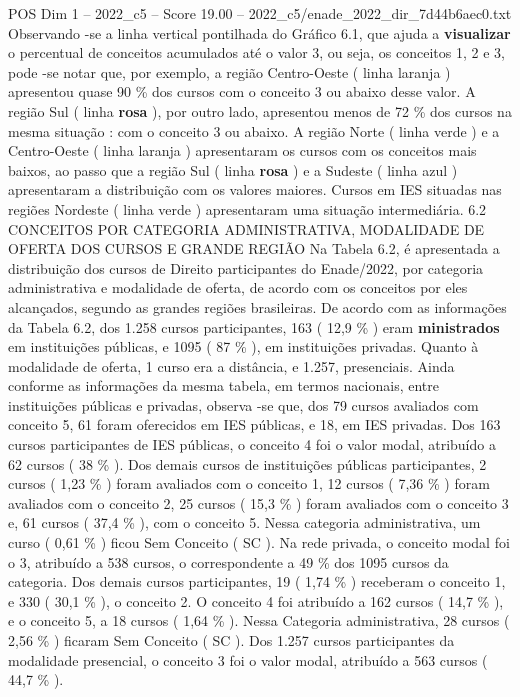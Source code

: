 \begin{textsample}{POS Dim 1 – 2022\_c5 – Score 19.00 – 2022\_c5/enade\_2022\_dir\_7d44b6aec0.txt}
Observando -se a linha vertical pontilhada do Gráfico 6.1, que ajuda a \textbf{visualizar} o percentual de conceitos acumulados até o valor 3, ou seja, os conceitos 1, 2 e 3, pode -se notar que, por exemplo, a região Centro-Oeste ( linha laranja ) apresentou quase 90 \% dos cursos com o conceito 3 ou abaixo desse valor.
A região Sul ( linha \textbf{rosa} ), por outro lado, apresentou menos de 72 \% dos cursos na mesma situação : com o conceito 3 ou abaixo.
A região Norte ( linha verde ) e a Centro-Oeste ( linha laranja ) apresentaram os cursos com os conceitos mais baixos, ao passo que a região Sul ( linha \textbf{rosa} ) e a Sudeste ( linha azul ) apresentaram a distribuição com os valores maiores.
Cursos em IES situadas nas regiões Nordeste ( linha verde ) apresentaram uma situação intermediária. 6.2 CONCEITOS POR CATEGORIA ADMINISTRATIVA, MODALIDADE DE OFERTA DOS CURSOS E GRANDE REGIÃO Na Tabela 6.2, é apresentada a distribuição dos cursos de Direito participantes do Enade/2022, por categoria administrativa e modalidade de oferta, de acordo com os conceitos por eles alcançados, segundo as grandes regiões brasileiras.
De acordo com as informações da Tabela 6.2, dos 1.258 cursos participantes, 163 ( 12,9 \% ) eram \textbf{ministrados} em instituições públicas, e 1095 ( 87 \% ), em instituições privadas.
Quanto à modalidade de oferta, 1 curso era a distância, e 1.257, presenciais.
Ainda conforme as informações da mesma tabela, em termos nacionais, entre instituições públicas e privadas, observa -se que, dos 79 cursos avaliados com conceito 5, 61 foram oferecidos em IES públicas, e 18, em IES privadas.
Dos 163 cursos participantes de IES públicas, o conceito 4 foi o valor modal, atribuído a 62 cursos ( 38 \% ).
Dos demais cursos de instituições públicas participantes, 2 cursos ( 1,23 \% ) foram avaliados com o conceito 1, 12 cursos ( 7,36 \% ) foram avaliados com o conceito 2, 25 cursos ( 15,3 \% ) foram avaliados com o conceito 3 e, 61 cursos ( 37,4 \% ), com o conceito 5.
Nessa categoria administrativa, um curso ( 0,61 \% ) ficou Sem Conceito ( SC ).
Na rede privada, o conceito modal foi o 3, atribuído a 538 cursos, o correspondente a 49 \% dos 1095 cursos da categoria.
Dos demais cursos participantes, 19 ( 1,74 \% ) receberam o conceito 1, e 330 ( 30,1 \% ), o conceito 2.
O conceito 4 foi atribuído a 162 cursos ( 14,7 \% ), e o conceito 5, a 18 cursos ( 1,64 \% ).
Nessa Categoria administrativa, 28 cursos ( 2,56 \% ) ficaram Sem Conceito ( SC ).
Dos 1.257 cursos participantes da modalidade presencial, o conceito 3 foi o valor modal, atribuído a 563 cursos ( 44,7 \% ).

\end{textsample}
